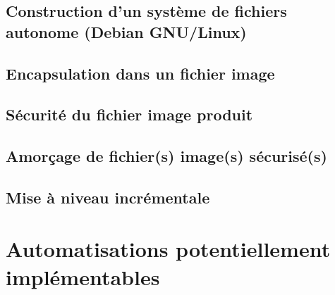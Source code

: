\ml
{\section{\todo}}
{\section{Construction d’un système de fichiers autonome (Debian GNU/Linux)}}

\ml
{\section{\todo}}
{\section{Encapsulation dans un fichier image}}

\ml
{\section{\todo}}
{\section{Sécurité du fichier image produit}}

\ml
{\section{\todo}}
{\section{Amorçage de fichier(s) image(s) sécurisé(s)}}

\ml
{\section{\todo}}
{\section{Mise à niveau incrémentale}}

\ml
{\chapter{\todo}}
{\chapter{Automatisations potentiellement implémentables}}

